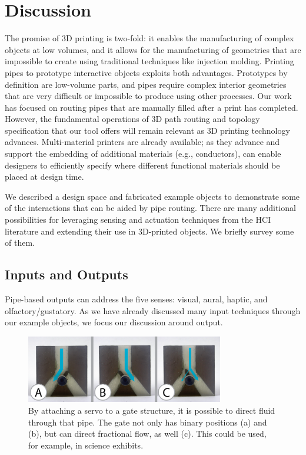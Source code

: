 \section{Discussion}

The promise of 3D printing is two-fold: it enables the manufacturing of complex objects at low volumes, and it allows for the manufacturing of geometries that are impossible to create using traditional techniques like injection molding.  Printing pipes to prototype interactive objects exploits both advantages. Prototypes by definition are low-volume parts, and pipes require complex interior geometries that are very difficult or impossible to produce using other processes. Our work has focused on routing pipes that are manually filled after a print has completed. However, the fundamental operations of 3D path routing and topology specification that our tool offers will remain relevant as 3D printing technology advances. Multi-material printers are already available; as they advance and support the embedding of additional materials (e.g., conductors), \systemname can enable designers to efficiently specify where different functional materials should be placed at design time.

We described a design space and fabricated example objects to demonstrate some of the interactions that can be aided by pipe routing. There are many additional possibilities for leveraging sensing and actuation techniques from the HCI literature and extending their use in 3D-printed objects. We briefly survey some of them.

\subsection{Inputs and Outputs}

Pipe-based outputs can address the five senses: visual, aural, haptic, and olfactory/gustatory.  As we have already discussed many input techniques through our example objects, we focus our discussion around output.  %

\begin{figure}[h]
\centering
    \includegraphics[width=3.4in]{figures/gates.png}
\caption{By attaching a servo to a gate structure, it is possible to direct fluid through that pipe.  The gate not only has binary positions (a) and (b), but can direct fractional flow, as well (c).  This could be used, for example, in science exhibits.}
\label{fig:direct}
\end{figure}

